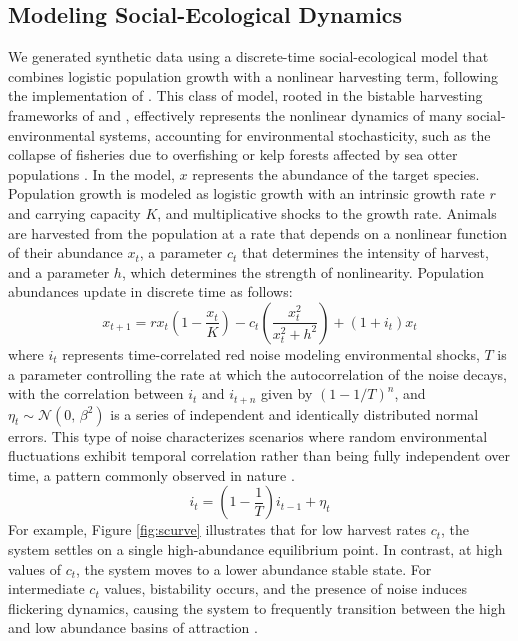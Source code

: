 \documentclass[openacc]{rsproca_new}%
\begin{document}
\subsection{Modeling Social-Ecological Dynamics}
We generated synthetic data using a discrete-time social-ecological model 
that combines logistic population growth with a nonlinear harvesting term, 
following the implementation of \textcite{Tilman2024}. This class of model, rooted in the bistable harvesting frameworks of \textcite{may1977} and \textcite{scheffer2001catastrophic}, effectively represents the nonlinear dynamics of many social-environmental systems, accounting for environmental stochasticity, such as the collapse of fisheries due to overfishing or kelp forests affected by sea otter populations \cite{nicholson_sea_2024}. In the model, $x$ represents the abundance of the target species. Population growth is modeled as logistic growth with an intrinsic growth rate $r$ and carrying capacity $K$, and multiplicative shocks to the growth rate. Animals are harvested from the population at a rate that depends on a nonlinear function of their abundance $x_t$, a parameter $c_t$ that determines the intensity of harvest, and a parameter $h$, which determines the strength of nonlinearity. Population abundances update in discrete time as follows: 
% 
\begin{equation}
    x_{t+1} = r x_{t} \left(1- \frac{x_t}{K}\right) - c_t \left(\frac{x_t^2}{x_t^2 + h^2}\right) + (1 + i_t) x_t
    \label{eq:discrete_time_x}
\end{equation}
% 
where $i_t$ represents time-correlated red noise modeling environmental shocks, $T$ is a parameter controlling the rate at which the autocorrelation of the noise decays, with the correlation between $i_t$ and $i_{t+n}$ given by $(1-1/T)^n$, and $\eta_t \sim \mathcal{N}(0,\,\beta^{2})$ is a series of independent and identically distributed normal errors. This type of noise characterizes scenarios where random environmental fluctuations exhibit temporal correlation rather than being fully independent over time, a pattern commonly observed in nature \cite{allen2010introduction}.
% 
\begin{equation}
    i_t = \left(1 - \frac{1}{T}\right) i_{t-1} + \eta_t
    \label{eq:noise}
\end{equation}
% 
For example, Figure \ref{fig:scurve} illustrates that for low harvest rates $c_t$, the system settles on a single high-abundance equilibrium point. In contrast, at high values of $c_t$, the system moves to a lower abundance stable state. For intermediate $c_t$ values, bistability occurs, and the presence of noise induces flickering dynamics, causing the system to frequently transition between the high and low abundance basins of attraction \cite{Tilman2024,Dakos2012}.
\end{document}
